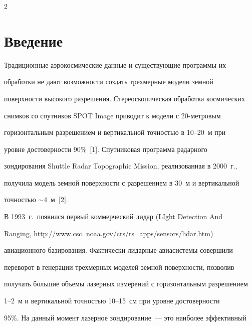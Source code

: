 



      \thispagestyle{headings}



      \begin{multicols}{2}



      \label{st\stat}

   

   

\section{Введение}



   Традиционные аэрокосмические данные и существующие программы их 

обработки не дают возможности создать трехмерные модели земной\linebreak 

поверхности высокого разрешения. Стереоскопическая обработка космических 

снимков со спутников SPOT Image приводит к модели с 20-метровым 

горизонтальным разрешением и вертикальной точ\-ностью в 10--20~м при 

уровне достоверности 90\%~[1]. Спутниковая программа радарного 

зондирования Shuttle Radar Topographic Mission, реализованная в 2000~г., 

получила модель земной поверхности с разрешением в 30~м и вертикальной 

точностью $\sim  4$~м~[2].

   

   В 1993~г.\ появился первый коммерческий лидар (LIght Detection And 

Ranging, {\sf http://www.csc. noaa.gov/crs/rs\_apps/sensors/lidar.htm)} 

авиационного базирования. Фактически лидарные авиасистемы совершили 

переворот в генерации трехмерных моделей земной поверхности, позволив 

получать большие объемы лазерных измерений с горизонтальным разрешением 

1--2~м и вертикальной точностью 10--15~см при уровне достоверности 

95\%. На данный момент лазерное зондирование~--- это наиболее эффективный 


\end{multicols}

